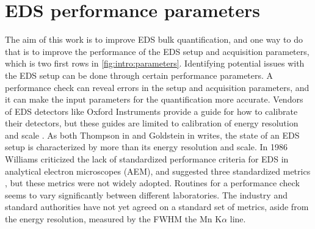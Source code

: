 


\clearpage








































\section{EDS performance parameters}
\label{theory:eds_performance}


The aim of this work is to improve EDS bulk quantification, and one way to do that is to improve the performance of the EDS setup and acquisition parameters, which is two first rows in \cref{fig:intro:parameters}.
Identifying potential issues with the EDS setup can be done through certain performance parameters.
A performance check can reveal errors in the setup and acquisition parameters, and it can make the input parameters for the quantification more accurate.
Vendors of EDS detectors like Oxford Instruments provide a guide for how to calibrate their detectors, but these guides are limited to calibration of energy resolution and scale \cite{aztec_manual}.
As both Thompson in \cite{keith_energy_res_2013} and Goldstein in \cite{goldstein_scanning_2018} writes, the state of an EDS setup is characterized by more than its energy resolution and scale.
In 1986 Williams criticized the lack of standardized performance criteria for EDS in analytical electron microscopes (AEM), and suggested three standardized metrics \cite{williams_standard_definitions_1986}, but these metrics were not widely adopted.
Routines for a performance check seems to vary significantly between different laboratories.
The industry and standard authorities have not yet agreed on a standard set of metrics, aside from the energy resolution, measured by the FWHM the Mn K$\alpha$ line.


